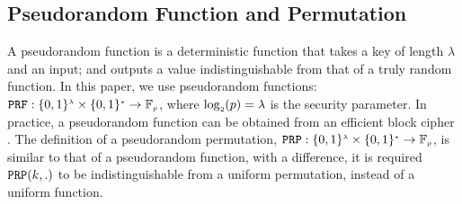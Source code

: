 %

%
\vspace{-4mm}
\subsection{Pseudorandom Function and Permutation}
\vspace{-1mm}

A pseudorandom function is a deterministic function that takes a key of length $\lambda$ and an input; and outputs a value  indistinguishable from that of  a truly random function.  In this paper, we use pseudorandom functions:   $\mathtt {PRF}: \{0,1\}^{\scriptscriptstyle \lambda}\times \{0,1\}^{\scriptscriptstyle *} \rightarrow  \mathbb{F}_{\scriptscriptstyle p}$, where $\log_{\scriptscriptstyle 2}(p)=\lambda$ is the security parameter. In practice, a pseudorandom function can be obtained from an efficient block cipher \cite{DBLP:books/crc/KatzLindell2007}. 
%
The definition of a pseudorandom permutation, $\mathtt {PRP}: \{0,1\}^{\scriptscriptstyle \lambda}\times \{0,1\}^{\scriptscriptstyle *} \rightarrow  \mathbb{F}_{\scriptscriptstyle p}$, is similar to that of a pseudorandom function, with a difference, it is required  $\mathtt{PRP}(k,.)$ to be indistinguishable from a uniform permutation, instead of a uniform function. %





